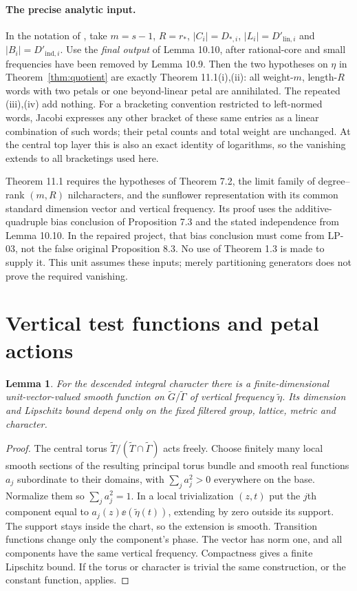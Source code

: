 \documentclass[11pt]{article}
\newtheorem{lemma}[theorem]{Lemma}
\begin{document}
\paragraph{The precise analytic input.}
In the notation of \cite{GTZ}, take $m=s-1$, $R=r_*$,
$|C_i|=D_{*,i}$, $|L_i|=D'_{\mathrm{lin},i}$ and
$|B_i|=D'_{\mathrm{ind},i}$. Use the \emph{final output} of Lemma 10.10,
after rational-core and small frequencies have been removed by Lemma 10.9.
Then the two hypotheses on $\eta$ in Theorem~\ref{thm:quotient} are exactly
Theorem 11.1(i),(ii): all weight-$m$, length-$R$ words with two petals or
one beyond-linear petal are annihilated. The repeated (iii),(iv) add nothing.
For a bracketing convention restricted to left-normed words, Jacobi expresses
any other bracket of these same entries as a linear combination of such words;
their petal counts and total weight are unchanged. At the central top layer
this is also an exact identity of logarithms, so the vanishing extends to
all bracketings used here.

Theorem 11.1 requires the hypotheses of Theorem 7.2, the limit family of
degree--rank $(m,R)$ nilcharacters, and the sunflower representation with
its common standard dimension vector and vertical frequency. Its proof uses
the additive-quadruple bias conclusion of Proposition 7.3 and the stated
independence from Lemma 10.10. In the repaired project, that bias conclusion
must come from LP-03, not the false original Proposition 8.3. No use of
Theorem 1.3 is made to supply it. This unit assumes these inputs; merely
partitioning generators does not prove the required vanishing.

\section{Vertical test functions and petal actions}
\begin{lemma}\label{lem:vertical}
For the descended integral character there is a finite-dimensional
unit-vector-valued smooth function on $\widetilde G/\widetilde\Gamma$ of
vertical frequency $\widetilde\eta$. Its dimension and Lipschitz bound depend
only on the fixed filtered group, lattice, metric and character.
\end{lemma}
\begin{proof}
The central torus $\widetilde T/(\widetilde T\cap\widetilde\Gamma)$ acts
freely. Choose finitely many local smooth sections of the resulting principal
torus bundle and smooth real functions $a_j$ subordinate to their domains,
with $\sum_j a_j^2>0$ everywhere on the base. Normalize them so
$\sum_j a_j^2=1$. In a local trivialization $(z,t)$ put the $j$th component
equal to $a_j(z)\ee(\widetilde\eta(t))$, extending by zero outside its
support. The support stays inside the chart, so the extension is smooth.
Transition functions change only the component's phase. The vector has
norm one, and all components have the same vertical frequency.
Compactness gives a finite Lipschitz bound. If the torus or character is
trivial the same construction, or the constant function, applies.
\end{proof}
\end{document}
